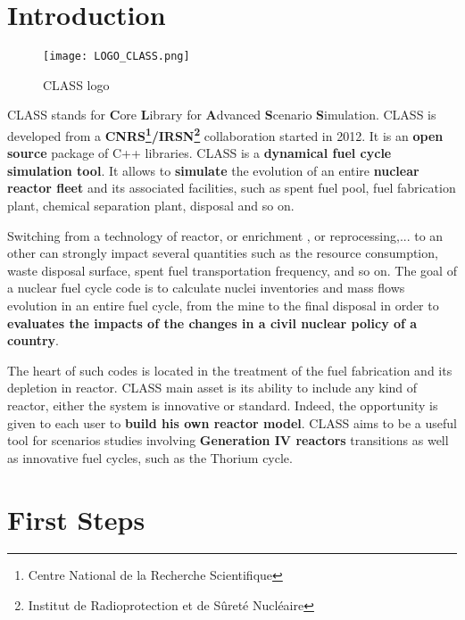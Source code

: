 

\part{Introduction}

    \begin{figure}[H]
    \centering
    \centerline{\texttt{[image: LOGO\_CLASS.png]}}
    \caption{CLASS logo}
    \label{fig:CLASSLogo}
    \end{figure}

    \vspace{2cm}

CLASS stands for \textbf{C}ore \textbf{L}ibrary for \textbf{A}dvanced \textbf{S}cenario \textbf{S}imulation. CLASS is developed from a \textbf{CNRS\footnote{Centre National de la Recherche Scientifique}/IRSN\footnote{Institut de Radioprotection et de S\^{u}ret\'{e} Nucl\'{e}aire}} collaboration started in 2012. It is an \textbf{open source} package of C++ libraries. 
CLASS is a \textbf{dynamical fuel cycle simulation tool}. It allows to \textbf{simulate} the evolution of an entire \textbf{nuclear reactor fleet} and its associated facilities, such as spent fuel pool, fuel fabrication plant, chemical separation plant, disposal and so on. 

Switching from a technology of reactor, or enrichment , or reprocessing,... to an other can strongly impact several quantities such as the resource consumption, waste disposal surface, spent fuel transportation frequency, and so on. The goal of a nuclear fuel cycle code is to calculate nuclei inventories and mass flows evolution in an entire fuel cycle, from the mine to the final disposal in order to \textbf{evaluates the impacts of the changes in a civil nuclear policy of a country}. 

The heart of such codes is located in the treatment of the fuel fabrication and its depletion in reactor. CLASS main asset is its ability to include any kind of reactor, either the system is innovative or standard. Indeed, the opportunity is given to each user to \textbf{build his own reactor model}. CLASS aims to be a useful tool for scenarios studies involving \textbf{Generation IV reactors} transitions as well as innovative fuel cycles, such as the Thorium cycle.



\part{First Steps}
